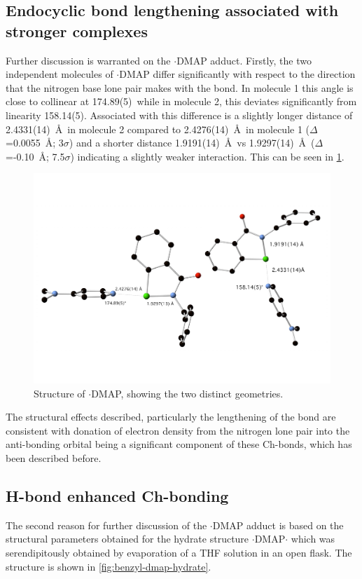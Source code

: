 \begin{refsection}
\subsection{Endocyclic bond lengthening associated with stronger complexes}
Further discussion is warranted on the $ \cdot $DMAP adduct.
Firstly, the two independent molecules of $ \cdot $DMAP differ significantly with respect to the direction that the nitrogen base lone pair makes with the  bond.
In molecule 1 this angle is close to collinear at 174.89(5)\degree\ while in molecule 2, this deviates significantly from linearity 158.14(5)\degree.
Associated with this difference is a slightly longer distance of 2.4331(14)~\AA\ in molecule 2 compared to 2.4276(14)~\AA\ in molecule 1 ($ \Delta $=0.0055~\AA{}; 3$ \sigma $) and a shorter  distance 1.9191(14)~\AA\ vs 1.9297(14)~\AA\ ($ \Delta $=-0.10~\AA{}; 7.5$ \sigma $) indicating a slightly weaker interaction.
This can be seen in \cref{fig:benzyl-dmap-xray-2}.

\begin{figure}
  \centering
  \includegraphics[width=0.8\linewidth]{Figures/benzyl-dmap-xray-2.pdf}
  \caption{Structure of $ \cdot $DMAP, showing the two distinct geometries.}\label{fig:benzyl-dmap-xray-2}
\end{figure}

The structural effects described, particularly the lengthening of the  bond are consistent with donation of electron density from the nitrogen lone pair into the  anti-bonding orbital being a significant component of these  Ch-bonds, which has been described before\autocite{Pascoe2017}.

\subsection{H-bond enhanced Ch-bonding}
The second reason for further discussion of the $ \cdot $DMAP adduct is based on the structural parameters obtained for the hydrate structure $ \cdot $DMAP$ \cdot $ which was serendipitously obtained by evaporation of a THF solution in an open flask.
The structure is shown in \cref{fig:benzyl-dmap-hydrate}.


\end{refsection}
